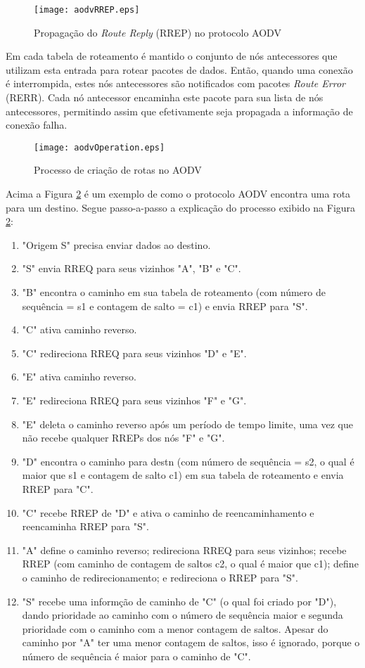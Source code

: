\begin{figure}[H]
	\centering
	\texttt{[image: aodvRREP.eps]}
	\caption{Propaga\c{c}\~ao do \textit{Route Reply} (RREP) no protocolo AODV \cite{pereira}}
	\label{figAodvRrep}
\end{figure}

Em cada tabela de roteamento \'e mantido o conjunto de n\'os antecessores que utilizam esta entrada para rotear pacotes de dados. Ent\~ao, quando uma conex\~ao \'e interrompida, estes n\'os antecessores s\~ao notificados com pacotes \textit{Route Error} (RERR). Cada n\'o antecessor encaminha este pacote para sua lista de n\'os antecessores, permitindo assim que efetivamente seja propagada a informa\c{c}\~ao de conex\~ao falha.

\begin{figure}[H]
	\centering
	\texttt{[image: aodvOperation.eps]}
	\caption{Processo de cria\c{c}\~ao de rotas no AODV \cite{gorantala}}
	\label{figOpAODV}
\end{figure}
Acima a Figura \ref{figOpAODV} \'e um exemplo de como o protocolo AODV encontra uma rota para um destino.
Segue passo-a-passo a explica\c{c}\~ao do processo exibido na Figura \ref{figOpAODV}:
\begin{enumerate}
	\item "Origem S" precisa enviar dados ao destino.
	\item "S" envia RREQ para seus vizinhos "A", "B" e "C".
	\item "B" encontra o caminho em sua tabela de roteamento (com n\'umero de sequ\^encia = s1 e contagem de salto = c1) e envia RREP para "S".
	\item "C" ativa caminho reverso.
	\item "C" redireciona RREQ para seus vizinhos "D" e "E".
	\item "E" ativa caminho reverso.
	\item "E" redireciona RREQ para seus vizinhos "F" e "G".
	\item "E" deleta o caminho reverso ap\'os um per\'iodo de tempo limite, uma vez que n\~ao recebe qualquer RREPs dos n\'os "F" e "G".
	\item "D" encontra o caminho para destn (com n\'umero de sequ\^encia = s2, o qual \'e maior que s1 e contagem de salto c1) em sua tabela de roteamento e envia RREP para "C".
	\item "C" recebe RREP de "D" e ativa o caminho de reencaminhamento e reencaminha RREP para "S".
	\item "A" define o caminho reverso; redireciona RREQ para seus vizinhos; recebe RREP (com caminho de contagem de saltos c2, o qual \'e maior que c1); define o caminho de redirecionamento; e redireciona o RREP para "S".
	\item "S" recebe uma inform\c{c}\~ao de caminho de "C" (o qual foi criado por "D"), dando prioridade ao caminho com o n\'umero de sequ\^encia maior e segunda prioridade com o caminho com a menor contagem de saltos. Apesar do caminho por "A" ter uma menor contagem de saltos, isso \'e ignorado, porque o n\'umero de sequ\^encia \'e maior para o caminho de "C".
\end{enumerate}

